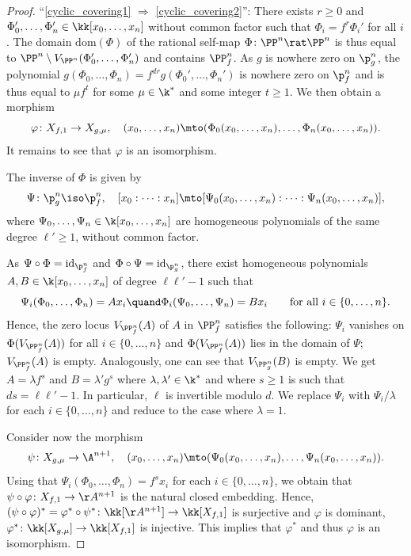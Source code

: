 \begin{proof}
``\eqref{cyclic_covering1} $\Rightarrow$ \eqref{cyclic_covering2}'':
There exists $r \geq 0$ and $\Phi_0', \ldots, \Phi_n'\in\kk[x_0, \ldots, x_n]$
without common factor such that
$\Phi_i = f^r \Phi_i'$ for all $i$. The domain $\textrm{dom}(\Phi)$ of the rational self-map $\Phi \colon \PP^n \rat \PP^n$
is thus equal to
$\PP^n \setminus V_{\PP^n}(\Phi'_0, \ldots, \Phi'_n)$ and contains $\PP^n_f$.
As $g$ is nowhere zero on $\p^n_g$, the polynomial $g(\Phi_0,\ldots,\Phi_n) = f^{dr} g(\Phi_0', \ldots, \Phi_n')$ is nowhere zero on $\p^n_f$ and is thus equal to $\mu f^t$ for some $\mu\in \k^*$ and some integer $t\ge 1$. We then obtain a morphism
\[
\varphi\colon X_{f,1} \to X_{g,\mu}, \quad
(x_0,\ldots,x_n)\mto (\Phi_0(x_0,\ldots,x_n),\ldots, \Phi_n(x_0,\ldots,x_n)).
\]
It remains to see that $\varphi$ is an isomorphism.

The inverse of $\Phi$ is given by
\[
\Psi\colon \p^n_g\iso \p^n_f, \quad [x_0:\cdots:x_n]\mto [\Psi_0(x_0,\ldots,x_n):\cdots: \Psi_n(x_0,\ldots,x_n)],
\]
where $\Psi_0,\ldots,\Psi_n\in \k[x_0,\ldots,x_n]$ are homogeneous polynomials of the same degree $\ell'\ge 1$, without common factor.

As $\Psi\circ \Phi=\mathrm{id}_{\p^n_f}$ and $\Phi\circ \Psi=\mathrm{id}_{\p^n_g}$, there exist homogeneous polynomials $A,B\in \k[x_0,\ldots,x_n]$ of degree $\ell\ell'-1$ such that
\[\Psi_i(\Phi_0,\ldots,\Phi_n)= Ax_i \quand\Phi_i(\Psi_0,\ldots,\Psi_n)= Bx_i \qquad\text{for all }i\in \{0,\ldots,n\}.\]
Hence, the zero locus $V_{\PP^n_f}(A)$ of $A$ in $\PP^n_f$ satisfies the following: $\Psi_i$ vanishes on $\Phi(V_{\PP^n_f}(A))$ for all
$i \in \{0, \ldots, n\}$
and $\Phi(V_{\PP^n_f}(A))$ lies in the domain of $\Psi$; \ie $V_{\PP^n_f}(A)$
is empty. Analogously, one can see that $V_{\PP^n_g}(B)$ is empty.
We get $A=\lambda f^s$ and $B=\lambda' g^{s}$ where $\lambda,\lambda'\in \k^*$ and where $s\ge 1$ is such that $ds=\ell\ell'-1$. In particular, $\ell$ is invertible modulo $d$.
We replace $\Psi_i$ with $\Psi_i/\lambda$ for each $i\in \{0,\ldots,n\}$ and reduce to the case where $\lambda=1$.

Consider now the morphism
\[
\psi\colon X_{g,\mu} \to \A^{n+1}, \quad
(x_0,\ldots,x_n)\mto (\Psi_0(x_0,\ldots,x_n),\ldots, \Psi_n(x_0,\ldots,x_n)).
\]
Using that $\Psi_i(\Phi_0,\ldots,\Phi_n)= f^sx_i$ for each $i\in \{0,\ldots,n\}$, we obtain that
$\psi\circ \varphi \colon X_{f, 1} \to \AA^{n+1}$ is the natural closed embedding.
Hence, $(\psi \circ \varphi)^\ast = \varphi^\ast \circ \psi^\ast \colon \kk[\AA^{n+1}] \to \kk[X_{f, 1}]$ is surjective and $\varphi$ is dominant, \ie $\varphi^\ast \colon \kk[X_{g, \mu}] \to \kk[X_{f, 1}]$ is injective.
This implies that
$\varphi^\ast$ and thus $\varphi$ is an isomorphism.


\end{proof}
